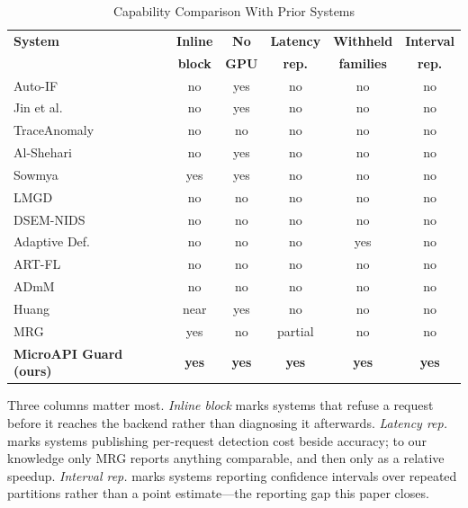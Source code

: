 \documentclass[conference]{IEEEtran}
\begin{document}
\begin{table}[H]
\caption{Capability Comparison With Prior Systems}
\label{tab:cmp}
\centering
\footnotesize
\setlength{\tabcolsep}{4pt}
\begin{tabularx}{\columnwidth}{@{}Lccccc@{}}
\toprule
\textbf{System} & \textbf{Inline} & \textbf{No} & \textbf{Latency} & \textbf{Withheld} &
\textbf{Interval} \\
 & \textbf{block} & \textbf{GPU} & \textbf{rep.} & \textbf{families} & \textbf{rep.} \\
\midrule
Auto-IF \cite{sadaf2020autoif}          & no  & yes & no  & no  & no \\
Jin et al. \cite{jin2020rpca}           & no  & yes & no  & no  & no \\
TraceAnomaly \cite{liu2020traceanomaly} & no  & no  & no  & no  & no \\
Al-Shehari \cite{alshehari2023insider}  & no  & yes & no  & no  & no \\
Sowmya \cite{sowmya2023api}             & yes & yes & no  & no  & no \\
LMGD \cite{liu2024lmgd}                 & no  & no  & no  & no  & no \\
DSEM-NIDS \cite{mahmoud2025dsem}        & no  & no  & no  & no  & no \\
Adaptive Def. \cite{alam2025adaptive}   & no  & no  & no  & yes & no \\
ART-FL \cite{raeiszadeh2025artfl}       & no  & no  & no  & no  & no \\
ADmM \cite{zhang2026admm}               & no  & no  & no  & no  & no \\
Huang \cite{huang2026gateway}           & near& yes & no  & no  & no \\
MRG \cite{levi2026mrg}                  & yes & no  & partial & no & no \\
\textbf{MicroAPI Guard (ours)} & \textbf{yes} & \textbf{yes} & \textbf{yes} &
\textbf{yes} & \textbf{yes} \\
\bottomrule
\end{tabularx}
\end{table}

Three columns matter most. \emph{Inline block} marks systems that refuse a request before it
reaches the backend rather than diagnosing it afterwards. \emph{Latency rep.} marks systems
publishing per-request detection cost beside accuracy; to our knowledge only MRG
\cite{levi2026mrg} reports anything comparable, and then only as a relative speedup.
\emph{Interval rep.} marks systems reporting confidence intervals over repeated partitions
rather than a point estimate---the reporting gap this paper closes.
\end{document}
